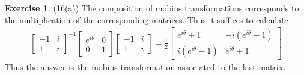\documentclass[12pt, psamsfonts]{amsart}
\theoremstyle{definition}
\newtheorem*{exer}{Exercise}
\theoremstyle{remark}
\numberwithin{equation}{section}
\begin{document}
\begin{exer}{(16(a))}
  The composition of mobius transformations corresponds to the multiplication of the corresponding matrices.
  Thus it suffices to calculate
  \begin{align*}
    \begin{bmatrix}
      -1 & i \\
      1 & i
    \end{bmatrix}^{-1}
    \begin{bmatrix}
      e^{i\theta} & 0 \\
      0 & 1
    \end{bmatrix}
    \begin{bmatrix}
      -1 & i \\
      1 & i
    \end{bmatrix}
    = \frac{1}{2} \begin{bmatrix} e^{i\theta} + 1 & -i(e^{i\theta} - 1) \\ i(e^{i\theta} - 1) & e^{i\theta} + 1 \end{bmatrix}
  \end{align*}
  Thus the answer is the mobius transformation associated to the last matrix.
\end{exer}
\end{document}
